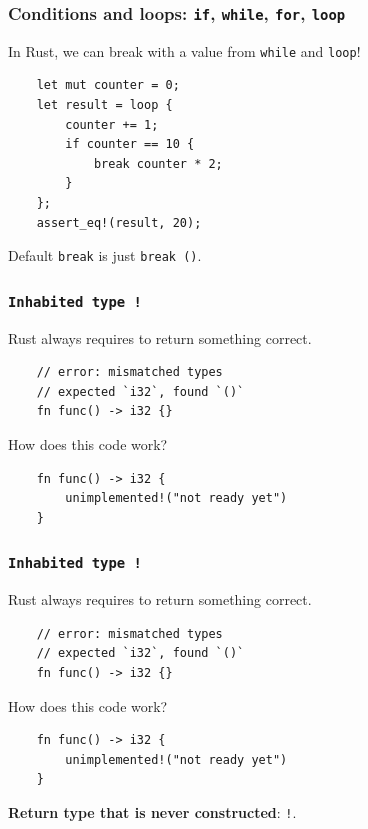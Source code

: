 \documentclass[aspectratio=1610,t]{beamer}
\begin{document}

\begin{frame}[fragile]
\frametitle{Conditions and loops: \texttt{if}, \texttt{while}, \texttt{for}, \texttt{loop}}
In Rust, we can break with a value from \texttt{while} and \texttt{loop}!

\begin{verbatim}
    let mut counter = 0;
    let result = loop {
        counter += 1;
        if counter == 10 {
            break counter * 2;
        }
    };
    assert_eq!(result, 20);
\end{verbatim}

Default \texttt{break} is just \texttt{break ()}.
\end{frame}


\begin{frame}[fragile]
\frametitle{\texttt{Inhabited type \texttt{!}}}
Rust always requires to return something correct.

\begin{verbatim}
    // error: mismatched types
    // expected `i32`, found `()`
    fn func() -> i32 {}
\end{verbatim}

How does this code work?

\begin{verbatim}
    fn func() -> i32 {
        unimplemented!("not ready yet")
    }
\end{verbatim}
\end{frame}


\begin{frame}[fragile]
\frametitle{\texttt{Inhabited type \texttt{!}}}
Rust always requires to return something correct.

\begin{verbatim}
    // error: mismatched types
    // expected `i32`, found `()`
    fn func() -> i32 {}
\end{verbatim}

How does this code work?

\begin{verbatim}
    fn func() -> i32 {
        unimplemented!("not ready yet")
    }
\end{verbatim}

\textbf{Return type that is never constructed}: \texttt{!}.
\end{frame}
\end{document}
